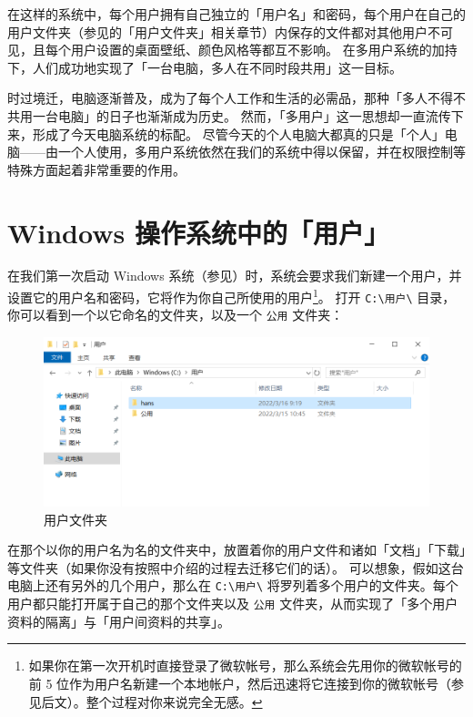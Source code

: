 在这样的系统中，每个用户拥有自己独立的「用户名」和密码，每个用户在自己的用户文件夹（参见的「用户文件夹」相关章节）内保存的文件都对其他用户不可见，且每个用户设置的桌面壁纸、颜色风格等都互不影响。
在多用户系统的加持下，人们成功地实现了「一台电脑，多人在不同时段共用」这一目标。

时过境迁，电脑逐渐普及，成为了每个人工作和生活的必需品，那种「多人不得不共用一台电脑」的日子也渐渐成为历史。
然而，「多用户」这一思想却一直流传下来，形成了今天电脑系统的标配。
尽管今天的个人电脑大都真的只是「个人」电脑——由一个人使用，多用户系统依然在我们的系统中得以保留，并在权限控制等特殊方面起着非常重要的作用。

\section{Windows 操作系统中的「用户」}

在我们第一次启动 Windows 系统（参见）时，系统会要求我们新建一个用户，并设置它的用户名和密码，它将作为你自己所使用的用户\footnote{如果你在第一次开机时直接登录了微软帐号，那么系统会先用你的微软帐号的前 5 位作为用户名新建一个本地帐户，然后迅速将它连接到你的微软帐号（参见后文）。整个过程对你来说完全无感。}。
打开 \verb|C:\用户\| 目录，你可以看到一个以它命名的文件夹，以及一个 \verb|公用| 文件夹：

\begin{figure}[htb!]
  \centering
  \includegraphics[width=12cm]{assets/User_Folder.png}
  \caption{用户文件夹}
  \label{user-folder}
\end{figure}

在那个以你的用户名为名的文件夹中，放置着你的用户文件和诸如「文档」「下载」等文件夹（如果你没有按照中介绍的过程去迁移它们的话）。
可以想象，假如这台电脑上还有另外的几个用户，那么在 \verb|C:\用户\| 将罗列着多个用户的文件夹。每个用户都只能打开属于自己的那个文件夹以及 \verb|公用| 文件夹，从而实现了「多个用户资料的隔离」与「用户间资料的共享」。


